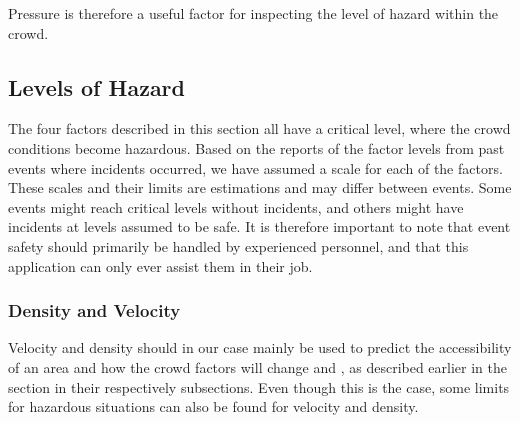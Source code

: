 Pressure is therefore a useful factor for inspecting the level of hazard within the crowd.


\subsection{Levels of Hazard}
\label{subsec:levelsOfHazard}
The four factors described in this section all have a critical level, where the crowd conditions become hazardous. Based on the reports of the factor levels from past events where incidents occurred, we have assumed a scale for each of the factors. These scales and their limits are estimations and may differ between events. Some events might reach critical levels without incidents, and others might have incidents at levels assumed to be safe. It is therefore important to note that event safety should primarily be handled by experienced personnel, and that this application can only ever assist them in their job.


\subsubsection{Density and Velocity}
Velocity and density should in our case mainly be used to predict the accessibility of an area and how the crowd factors will change and , as described earlier in the section in their respectively subsections. Even though this is the case, some limits for hazardous situations can also be found for velocity and density.

